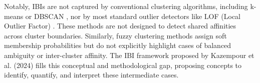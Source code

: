 Notably, IBIs are not captured by conventional clustering algorithms, including k-means \cite{kMeans} or DBSCAN \cite{DBSCAN}, nor by most standard outlier detectors like LOF (Local Outlier Factor) \cite{LOF}. These methods are not designed to detect shared affinities across cluster boundaries. Similarly, fuzzy clustering methods assign soft membership probabilities but do not explicitly highlight cases of balanced ambiguity or inter-cluster affinity. The IBI framework proposed by Kazempour et al. (2024) \cite{Kazempour24} fills this conceptual and methodological gap, proposing concepts to identify, quantify, and interpret these intermediate cases.
